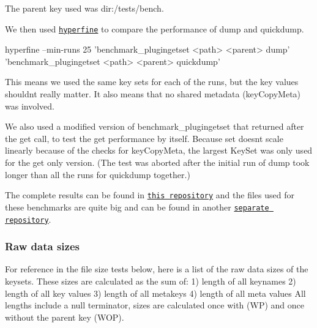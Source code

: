 The parent key used was {\ttfamily dir\+:/tests/bench}.

We then used \href{https://github.com/sharkdp/hyperfine}{\tt {\ttfamily hyperfine}} to compare the performance of {\ttfamily dump} and {\ttfamily quickdump}.


\begin{DoxyCode}
hyperfine --min-runs 25 'benchmark\_plugingetset <path> <parent> dump' 'benchmark\_plugingetset <path>
       <parent> quickdump'
\end{DoxyCode}


This means we used the same key sets for each of the runs, but the key values shouldn\textquotesingle{}t really matter. It also means that no shared metadata ({\ttfamily key\+Copy\+Meta}) was involved.

We also used a modified version of {\ttfamily benchmark\+\_\+plugingetset} that returned after the {\ttfamily get} call, to test the {\ttfamily get} performance by itself. Because {\ttfamily set} doesn\textquotesingle{}t scale linearly because of the checks for {\ttfamily key\+Copy\+Meta}, the largest Key\+Set was only used for the {\ttfamily get} only version. (The test was aborted after the initial run of {\ttfamily dump} took longer than all the runs for {\ttfamily quickdump} together.)

The complete results can be found in \href{https://github.com/ElektraInitiative/rawdata}{\tt this repository} and the files used for these benchmarks are quite big and can be found in another \href{https://github.com/kodebach/eqd-bench}{\tt separate repository}.\hypertarget{autotoc_md510_autotoc_md513}{}\subsubsection{Raw data sizes}\label{autotoc_md510_autotoc_md513}
For reference in the file size tests below, here is a list of the raw data sizes of the keysets. These sizes are calculated as the sum of\+: 1) length of all keynames 2) length of all key values 3) length of all metakeys 4) length of all meta values All lengths include a null terminator, sizes are calculated once with (WP) and once without the parent key (W\+OP).

